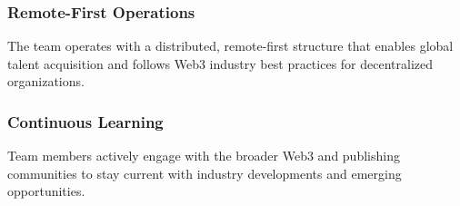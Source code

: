 \subsubsection{Remote-First Operations}

The team operates with a distributed, remote-first structure that enables global talent acquisition and follows Web3 industry best practices for decentralized organizations.

\subsubsection{Continuous Learning}

Team members actively engage with the broader Web3 and publishing communities to stay current with industry developments and emerging opportunities.